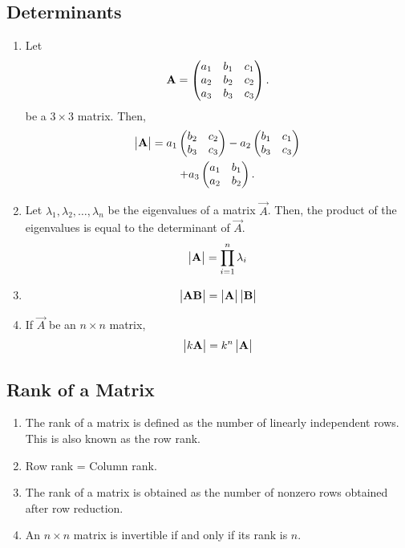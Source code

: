 \documentclass[journal,12pt,onecolumn]{IEEEtran}
\renewcommand\thesection{\arabic{section}}
\renewcommand\thesubsection{\thesection.\arabic{subsection}}
\begin{document}
\subsection{Determinants}
\renewcommand{\theequation}{\theenumi}
\begin{enumerate}[label=\thesubsection.\arabic*.,ref=\thesubsection.\theenumi]

\item Let 
\begin{align}
	\mathbf{A} = \begin{pmatrix}a_1 & b_1 & c_1  \\ a_2 & b_2 & c_2  \\ a_3 & b_3 & c_3\end{pmatrix}.
\end{align}
be a $3 \times 3$ matrix. 
Then, 
\begin{multline}
	\begin{vmatrix}\mathbf{A}\end{vmatrix} = a_1 \begin{pmatrix} b_2 & c_2 \\  b_3 & c_3\end{pmatrix} - a_2\begin{pmatrix} b_1 & c_1 \\  b_3 & c_3 \end{pmatrix}  \\ + a_3\begin{pmatrix}a_1 & b_1 \\ a_2 & b_2 \end{pmatrix}.
\end{multline}
\item Let $\lambda_1,\lambda_2, \dots, \lambda_n$ be the eigenvalues of a matrix $\vec{A}$.  Then,   the product of the eigenvalues is equal to the determinant of $\vec{A}$.
\begin{align}
	\begin{vmatrix}\mathbf{A}\end{vmatrix} = \prod_{i=1}^{n}\lambda_i
\end{align}
%
\item 
\begin{align}
	\begin{vmatrix}\mathbf{A}\mathbf{B}\end{vmatrix} = \begin{vmatrix}\mathbf{A}\end{vmatrix}\begin{vmatrix}\mathbf{B}\end{vmatrix}
\end{align}
\item If $\vec{A}$ be an $n \times n$ matrix, 
\begin{align}
	\label{eq:det_kord}
	\begin{vmatrix}k\mathbf{A}\end{vmatrix} = k^n\begin{vmatrix}\mathbf{A}\end{vmatrix}
\end{align}

\end{enumerate}
\subsection{Rank of a Matrix}
\renewcommand{\theequation}{\theenumi}
\begin{enumerate}[label=\thesubsection.\arabic*.,ref=\thesubsection.\theenumi]
\item The rank of a matrix is defined as the number of linearly independent rows.  This is also known as the row rank.
\item Row rank = Column rank.
\item The rank of a matrix is obtained as the number of nonzero rows obtained after row reduction.
\item An $n \times n$ matrix is invertible if and only if its rank is $n$.
\end{enumerate}
\end{document}
